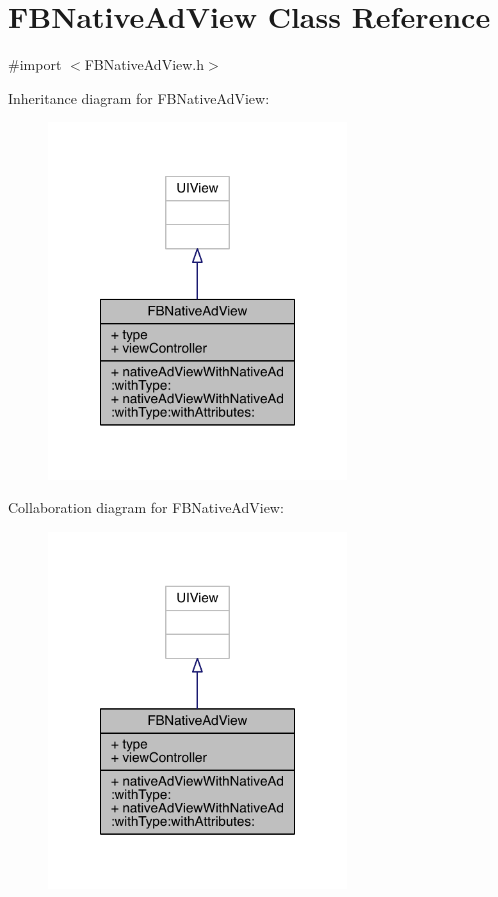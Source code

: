 \hypertarget{interface_f_b_native_ad_view}{\section{F\-B\-Native\-Ad\-View Class Reference}
\label{interface_f_b_native_ad_view}
}


{\ttfamily \#import $<$F\-B\-Native\-Ad\-View.\-h$>$}



Inheritance diagram for F\-B\-Native\-Ad\-View\-:
\nopagebreak
\begin{figure}[H]
\begin{center}
\leavevmode
\includegraphics[width=224pt]{interface_f_b_native_ad_view__inherit__graph}
\end{center}
\end{figure}


Collaboration diagram for F\-B\-Native\-Ad\-View\-:
\nopagebreak
\begin{figure}[H]
\begin{center}
\leavevmode
\includegraphics[width=224pt]{interface_f_b_native_ad_view__coll__graph}
\end{center}
\end{figure}
